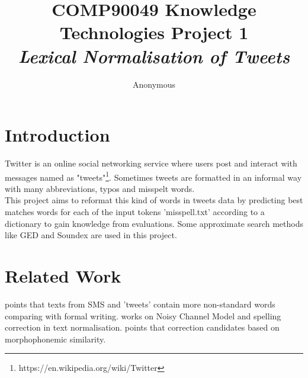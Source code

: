 \documentclass[11pt]{article}
\title{COMP90049 Knowledge Technologies Project 1
\\ \Large \textit{Lexical Normalisation of Tweets}}
\author{Anonymous}
\begin{document}
\maketitle

\section{Introduction}
Twitter is an online social networking service where users post and interact with messages named as "tweets"\footnote{https://en.wikipedia.org/wiki/Twitter}. Sometimes tweets are formatted in an informal way with many abbreviations, typos and misspelt words. 
\\This project aims to reformat this kind of words in tweets data by predicting best matches words for each of the input tokens 'misspell.txt' according to a dictionary to gain knowledge from evaluations. Some approximate search methods like GED and Soundex are used in this project. 
\section{Related Work}
 points that texts from SMS and 'tweets' contain more non-standard words comparing with formal writing. 
 works on Noisy Channel Model and spelling correction in text normalisation.
 points that correction candidates based on morphophonemic similarity.
\end{document}
